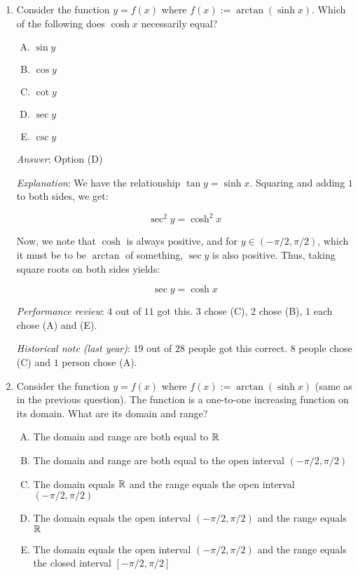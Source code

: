 \documentclass[10pt]{amsart}
\begin{document}
\begin{enumerate}
  {\em Performance review}: $6$ out of $11$ got this. $4$ chose (A),
  $1$ chose (B).

  {\em Historical note (last year)}: $24$ out of $28$ people got this
  correct. $3$ people chose (C) and $1$ person chose (B).
\item Consider the function $y = f(x)$ where $f(x) := \arctan(\sinh
  x)$. Which of the following does $\cosh x$ necessarily equal?

  \begin{enumerate}[(A)]
  \item $\sin y$
  \item $\cos y$
  \item $\cot y$
  \item $\sec y$
  \item $\csc y$
  \end{enumerate}

  {\em Answer}: Option (D)

  {\em Explanation}: We have the relationship $\tan y = \sinh
  x$. Squaring and adding $1$ to both sides, we get:

  $$\sec^2 y = \cosh^2 x$$

  Now, we note that $\cosh$ is always positive, and for $y \in
  (-\pi/2,\pi/2)$, which it must be to be $\arctan$ of something,
  $\sec y$ is also positive. Thus, taking square roots on both sides
  yields:

  $$\sec y = \cosh x$$

  {\em Performance review}: $4$ out of $11$ got this. $3$ chose (C),
  $2$ chose (B), $1$ each chose (A) and (E).

  {\em Historical note (last year)}: $19$ out of $28$ people got this
  correct. $8$ people chose (C) and $1$ person chose (A).

\item Consider the function $y = f(x)$ where $f(x) := \arctan(\sinh
  x)$ (same as in the previous question). The function is a one-to-one
  increasing function on its domain. What are its domain and range?

  \begin{enumerate}[(A)]
  \item The domain and range are both equal to $\mathbb{R}$
  \item The domain and range are both equal to the open interval
    $(-\pi/2,\pi/2)$
  \item The domain equals $\mathbb{R}$ and the range equals the open interval
    $(-\pi/2,\pi/2)$
  \item The domain equals the open interval $(-\pi/2,\pi/2)$ and the range
    equals $\mathbb{R}$
  \item The domain equals the open interval $(-\pi/2,\pi/2)$ and the
    range equals the closed interval $[-\pi/2,\pi/2]$
  \end{enumerate}


\end{enumerate}
\end{document}
